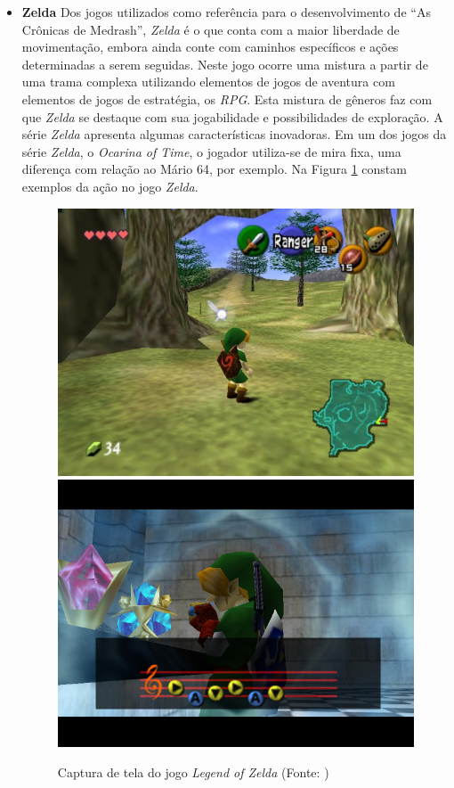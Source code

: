 \begin{itemize}
\item {\bf Zelda\cite{bib:zelda_game}}
Dos jogos utilizados como referência para o desenvolvimento de
 ``As Crônicas de Medrash'',
\textit{Zelda} é o que conta com a maior liberdade de movimentação, embora ainda conte com 
caminhos específicos e ações determinadas a serem seguidas.
Neste jogo ocorre uma mistura a partir de uma trama complexa utilizando 
elementos de jogos de aventura com elementos de jogos de estratégia, os \textit{RPG}. 
Esta mistura de gêneros faz com que \textit{Zelda} se destaque com sua jogabilidade e
 possibilidades de exploração. 
A série \textit{Zelda} apresenta algumas características inovadoras. Em um dos jogos
 da série \textit{Zelda}, o \textit{Ocarina of Time}, o jogador utiliza-se de mira fixa, uma diferença 
com relação ao Mário 64, por exemplo.
Na Figura \ref{img:zelda} constam exemplos da ação no jogo \textit{Zelda}.

\begin{figure}[!ht]
 \centering
 \includegraphics[scale=0.35]{Imagens/zelda1.png}
 \includegraphics[scale=0.35]{Imagens/zelda2.png}
 \caption{Captura de tela do jogo \textit{Legend of Zelda}
(Fonte: \cite{bib:zelda01})}
 \label{img:zelda}
\end{figure}


\end{itemize}
